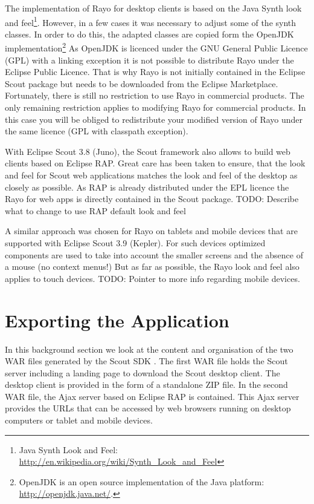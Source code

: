 \documentclass[a4paper,10pt,twoside]{book}
\begin{document}
The implementation of Rayo for desktop clients is based on the Java Synth look and feel\footnote{
Java Synth Look and Feel: \url{http://en.wikipedia.org/wiki/Synth_Look_and_Feel}
}.
However, in a few cases it was necessary to adjust some of the synth classes. 
In order to do this, the adapted classes are copied form the OpenJDK implementation\footnote{
OpenJDK is an open source implementation of the Java platform: \url{http://openjdk.java.net/}.
}
As OpenJDK is licenced under the GNU General Public Licence (GPL) with a linking exception it is not possible to distribute Rayo under the Eclipse Public Licence.
That is why Rayo is not initially contained in the Eclipse Scout package but needs to be downloaded from the Eclipse Marketplace.
Fortunately, there is still no restriction to use Rayo in commercial products.
The only remaining restriction applies to modifying Rayo for commercial products.
In this case you will be obliged to redistribute your modified version of Rayo under the same licence (GPL with classpath exception).

With Eclipse Scout 3.8 (Juno), the Scout framework also allows to build web clients based on Eclipse RAP.
Great care has been taken to ensure, that the look and feel for Scout web applications matches the look and feel of the desktop as closely as possible.
As RAP is already distributed under the EPL licence the Rayo for web apps is directly contained in the Scout package.
TODO: Describe what to change to use RAP default look and feel

A similar approach was chosen for Rayo on tablets and mobile devices that are supported with Eclipse Scout 3.9 (Kepler).
For such devices optimized components are used to take into account the smaller screens and the absence of a mouse (no context menus!)
But as far as possible, the Rayo look and feel also applies to touch devices.
TODO: Pointer to more info regarding mobile devices.

\section{Exporting the Application}

In this background section we look at the content and organisation of the two WAR files generated by the Scout SDK .
The first WAR file holds the Scout server including a landing page to download the Scout desktop client.
The desktop client is provided in the form of a standalone ZIP file.
In the second WAR file, the Ajax server based on Eclipse RAP is contained.
This Ajax server provides the URLs that can be accessed by web browsers running on desktop computers or tablet and mobile devices.
\end{document}
